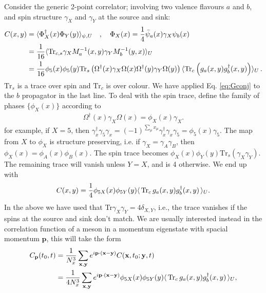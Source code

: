 Consider the generic 2-point correlator; involving two valence flavours $a$ and $b$, and spin structure $\gamma_X$ and $\gamma_Y$ at the source and sink:
\begin{align}
  C(x,y) &= \langle \Phi^{\dagger}_X(x) \Phi_Y(y) \rangle_{\psi,U} \quad , \quad \Phi_X(x) = {1\over 4}\bar{\psi}_a(x) \gamma_X \psi_b(x) \\
  \nonumber
  &= {1\over 16}\langle \text{Tr}_{c,s} \gamma_X M^{-1}_{a}(x,y) \gamma_Y M^{-1}_{b}(y,x) \rangle_U \\
  &= {1\over 16}\phi_5(x)\phi_5(y)\text{Tr}_s \left( \Omega^{\dagger}(x) \gamma_X \Omega(x) \Omega^{\dagger}(y) \gamma_Y \Omega(y) \right)
  \langle \text{Tr}_c \left( g_{a}(x,y) g^{\dagger}_{b}(x,y) \right) \rangle_U\,. \nonumber
\end{align}
$\text{Tr}_s$ is a trace over spin and $\text{Tr}_c$ is over colour. We have applied Eq. \eqref{eq:Gconj} to the $b$ propagator in the last line. To deal with the spin trace, define the family of phases $\{\phi_X(x)\}$ according to
\begin{align}
  \Omega^{\dagger}(x)\gamma_X\Omega(x) = \phi_X(x) \gamma_X.
\end{align}
for example, if $X=5$, then $\gamma^{\dagger}_x\gamma_5\gamma_x = (-1)^{\sum_{\mu}x_{\mu}} \gamma^{\dagger}_x\gamma_x \gamma_5 = \phi_5(x) \gamma_5$. The map from $X$ to $\phi_X$ is structure preserving, i.e. if $\gamma_X=\gamma_A\gamma_B$, then $\phi_X(x)=\phi_A(x)\phi_B(x)$. The spin trace becomes $\phi_X(x)\phi_Y(y) \text{Tr}_s\left( \gamma_X \gamma_Y \right)$. The remaining trace will vanish unless $Y=X$, and is 4 otherwise. We end up with
\begin{align}
  C(x,y) = {1\over 4} \phi_{5X}(x)\phi_{5Y}(y) \langle \,\text{Tr}_c \,g_a(x,y) g^{\dagger}_b(x,y) \,\rangle_U.
\end{align}
In the above we have used that Tr$\gamma_X\gamma_Y=4\delta_{X,Y}$, i.e., the trace vanishes if the spins at the source and sink don't match.
We are usually interested instead in the correlation function of a meson in a momentum eigenstate with spacial momentum ${\textbf{p}}$, this will take the form
\begin{align}
  \nonumber
  C_{\textbf{p}}(t_0,t) &= {1\over N_x^3} \sum_{{\textbf{x}},{\textbf{y}}} e^{i{\textbf{p}}\cdot({\textbf{x}}-{\textbf{y}})}
  C({\textbf{x}},t_0;{\textbf{y}},t) \\
  &= {1\over 4 N_x^3} \sum_{{\textbf{x}},{\textbf{y}}} e^{i{\textbf{p}}\cdot({\textbf{x}}-{\textbf{y}})} \phi_{5X}(x)\phi_{5Y}(y) \langle \,\text{Tr}_c \,g_a(x,y)g^{\dagger}_b(x,y)\,\rangle_U,
\end{align}
